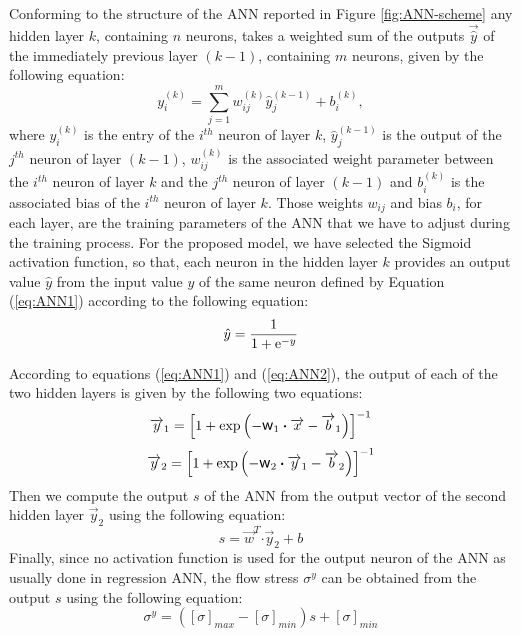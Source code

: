 \documentclass[algorithms,article,submit,pdftex,moreauthors]{Definitions/mdpi}
\DeclareRobustCommand{\w}{\mbox{\large\ensuremath{\mathsf{w}}}}
\DeclareRobustCommand{\dotp}{\boldsymbol{\cdot}}
\DeclareRobustCommand{\e}[1]{{\rm e}^{#1}}
\DeclareRobustCommand{\lay}[1]{^{(#1)}}
\begin{document}
Conforming to the structure of the ANN reported in Figure \ref{fig:ANN-scheme} any hidden layer $k$, containing $n$ neurons, takes a weighted sum of the outputs $\overrightarrow{\hat{y}}$ of the immediately previous layer $(k-1)$, containing $m$ neurons, given by the following equation:
\begin{equation}
y_i\lay{k} = \sum_{j=1}^m w_{ij}\lay{k} \hat{y}_j^{(k-1)}+ b_i\lay{k},\label{eq:ANN1}
\end{equation}
where $y_i\lay{k}$ is the entry of the $i^{th}$ neuron of layer $k$, $\hat{y}_j\lay{k-1}$ is the output of the $j^{th}$ neuron of layer $(k-1)$, $w_{ij}\lay{k}$ is the associated weight parameter between the $i^{th}$ neuron of layer $k$ and the $j^{th}$ neuron of layer $(k-1)$ and $b_i\lay{k}$ is the associated bias of the $i^{th}$ neuron of layer $k$.
Those weights $w_{ij}$ and bias $b_i$, for each layer, are the training parameters of the ANN that we have to adjust during the training process.
For the proposed model, we have selected the Sigmoid activation function, so that, each neuron in the hidden layer $k$ provides an output value ${\hat{y}}$ from the input value $y$ of the same neuron defined by Equation (\ref{eq:ANN1}) according to the following equation:
\begin{equation}
\hat{y}=\frac{1}{1 + \e{-y}}\label{eq:ANN2}
\end{equation}

According to equations (\ref{eq:ANN1}) and (\ref{eq:ANN2}), the output of each of the two hidden layers is given by the following two equations:
\begin{equation}
\overrightarrow{y}_1 = \left[1 + \exp{\left(- \w_1 \dotp \overrightarrow{x}- \overrightarrow{b}_1\right)}\right]^{-1}\label{eq:ANN3}
\end{equation}
\begin{equation}
\overrightarrow{y}_2 = \left[1 + \exp{\left(- \w_2 \dotp \overrightarrow{y}_1- \overrightarrow{b}_2\right)}\right]^{-1}\label{eq:ANN4}
\end{equation}
Then we compute the output $s$ of the ANN from the output vector of the second hidden layer $\overrightarrow{y}_2$ using the following equation:
\begin{equation}
s = \overrightarrow{w}^T \dotp \overrightarrow{y}_2 + b\label{eq:ANN5}
\end{equation}
Finally, since no activation function is used for the output neuron of the ANN as usually done in regression ANN, the flow stress $\sigma^y$ can be obtained from the output $s$ using the following equation:
\begin{equation}
\sigma^y =  \left([\sigma]_{max}-[\sigma]_{min}\right)s + [\sigma]_{min} \label{eq:CR2}
\end{equation}
\end{document}
